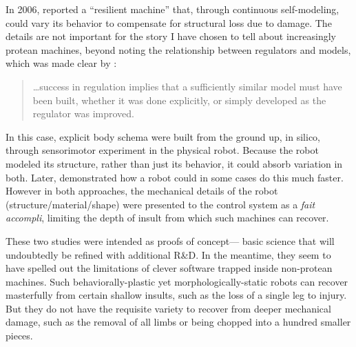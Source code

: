 In 2006,
\citet{bongard2006resilient} reported a ``resilient machine'' that, through continuous self-modeling,
could vary its behavior to compensate for structural loss due to damage.
The details are not 
important for the story I have chosen to tell about increasingly protean machines,
beyond noting the relationship between regulators and models, which was made clear by \citet{conant1970every}:
\begin{quote}
\small
\dots success in regulation implies that a sufficiently similar model must have been built, whether it was done explicitly, or simply developed as the regulator was improved.
\end{quote}
In this case, explicit body schema were built from the ground up, in silico, through sensorimotor experiment in the physical robot.
Because the robot modeled its structure, rather than just its behavior, it could absorb variation in both.
Later, \citet{cully2015robots} demonstrated how a robot could in some cases do this much faster.
However in both approaches, the mechanical details of the robot (structure/material/shape) were presented to the control system as a \textit{fait accompli},
limiting the depth of insult 
from which such machines can recover.


These two studies were intended as proofs of concept---%
basic science
that will undoubtedly be refined with additional R\&D.
In the meantime, they seem to have spelled out the limitations of clever software trapped inside non-protean machines.
Such
behaviorally-plastic yet morphologically-static robots can recover masterfully from certain shallow insults, such as the
loss of a single leg to injury.
But they do not have the requisite variety to recover from deeper mechanical damage, such as the removal of all limbs or being chopped into a hundred smaller pieces.


